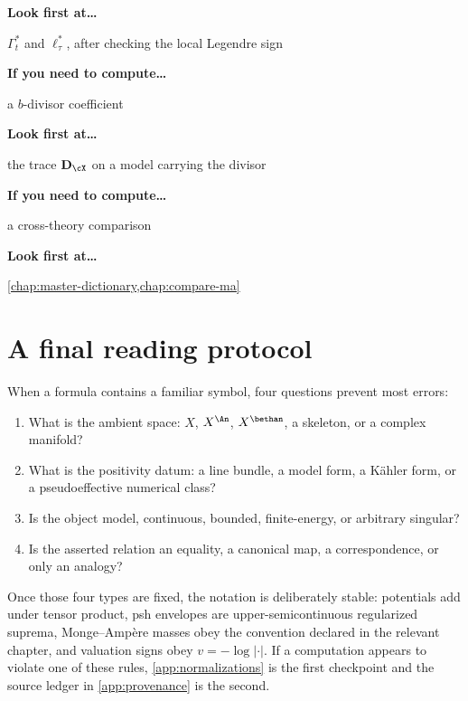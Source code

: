 \textbf{Look first at\ldots}\par\nopagebreak
\(\Gamma_t^*\) and \(\ell_\tau^*\), after checking the local Legendre
sign

\medskip
\textbf{If you need to compute\ldots}\par\nopagebreak
a \(b\)-divisor coefficient\par\nopagebreak

\textbf{Look first at\ldots}\par\nopagebreak
the trace \(\mathbf D_\cX\) on a model carrying the divisor

\medskip
\textbf{If you need to compute\ldots}\par\nopagebreak
a cross-theory comparison\par\nopagebreak

\textbf{Look first at\ldots}\par\nopagebreak
\cref{chap:master-dictionary,chap:compare-ma}

\endgroup

\section{A final reading protocol}
\label{sec:appK-protocol}

When a formula contains a familiar symbol, four questions prevent most
errors:

\begin{enumerate}
\item What is the ambient space: \(X\), \(X^{\An}\), \(X^{\bethan}\), a
  skeleton, or a complex manifold?
\item What is the positivity datum: a line bundle, a model form, a Kähler
  form, or a pseudoeffective numerical class?
\item Is the object model, continuous, bounded, finite-energy, or arbitrary
  singular?
\item Is the asserted relation an equality, a canonical map, a
  correspondence, or only an analogy?
\end{enumerate}

Once those four types are fixed, the notation is deliberately stable:
potentials add under tensor product, psh envelopes are upper-semicontinuous
regularized suprema, Monge--Amp\`ere masses obey the convention declared in
the relevant chapter, and valuation signs obey \(v=-\log|\cdot|\).  If a computation appears to
violate one of these rules, \cref{app:normalizations} is the first
checkpoint and the source ledger in \cref{app:provenance} is the second.
